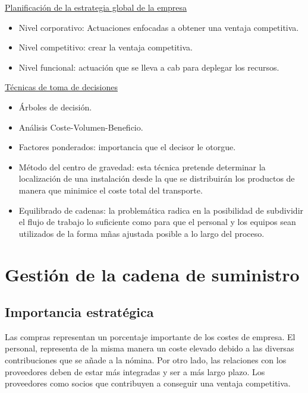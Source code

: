 \documentclass[12pt]{report} %
\providecommand{\tightlist}{%
  \setlength{\itemsep}{0pt}\setlength{\parskip}{0pt}}
\begin{document}
\underline{Planificación de la estrategia global de la empresa}

\begin{itemize}
\tightlist
\item
  Nivel corporativo: Actuaciones enfocadas a obtener una ventaja
  competitiva.
\item
  Nivel competitivo: crear la ventaja competitiva.
\item
  Nivel funcional: actuación que se lleva a cab para deplegar los
  recursos.
\end{itemize}

\underline{Técnicas de toma de decisiones}

\begin{itemize}
\tightlist
\item
  Árboles de decisión.
\item
  Análisis Coste-Volumen-Beneficio.
\item
  Factores ponderados: importancia que el decisor le otorgue.
\item
  Método del centro de gravedad: esta técnica pretende determinar la
  localización de una instalación desde la que se distribuirán los
  productos de manera que minimice el coste total del transporte.
\item
  Equilibrado de cadenas: la problemática radica en la posibilidad de
  subdividir el flujo de trabajo lo suficiente como para que el personal
  y los equipos sean utilizados de la forma mñas ajustada posible a lo
  largo del proceso.
\end{itemize}


\hypertarget{gestiuxf3n-de-la-cadena-de-suministro}{%
\chapter{Gestión de la cadena de
suministro}\label{gestiuxf3n-de-la-cadena-de-suministro}}

\hypertarget{importancia-estratuxe9gica}{%
\section{Importancia estratégica}\label{importancia-estratuxe9gica}}

Las compras representan un porcentaje importante de los costes de
empresa. El personal, representa de la misma manera un coste elevado
debido a las diversas contribuciones que se añade a la nómina. Por otro
lado, las relaciones con los proveedores deben de estar más integradas y
ser a más largo plazo. Los proveedores como socios que contribuyen a
conseguir una ventaja competitiva.
\end{document}
